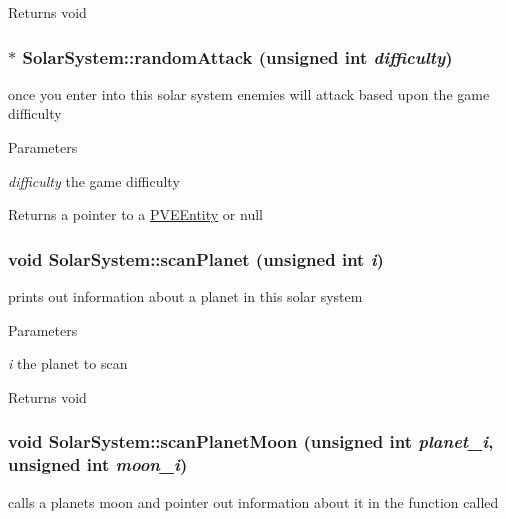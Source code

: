 \begin{DoxyReturn}{Returns}
void 
\end{DoxyReturn}
\hypertarget{classSolarSystem_a6f30ebe96f6ef56d967f3e6c368057d2}{
\subsubsection[{randomAttack}]{ $\ast$ SolarSystem::randomAttack (unsigned int {\em difficulty})}}
\label{df/d5e/classSolarSystem_a6f30ebe96f6ef56d967f3e6c368057d2}
once you enter into this solar system enemies will attack based upon the game difficulty


\begin{DoxyParams}{Parameters}
\item[{\em difficulty}]the game difficulty\end{DoxyParams}
\begin{DoxyReturn}{Returns}
a pointer to a \hyperlink{classPVEEntity}{PVEEntity} or null 
\end{DoxyReturn}
\hypertarget{classSolarSystem_a7be656472d3867ed7eb416da51982463}{
\subsubsection[{scanPlanet}]{\setlength{\rightskip}{0pt plus 5cm}void SolarSystem::scanPlanet (unsigned int {\em i})}}
\label{df/d5e/classSolarSystem_a7be656472d3867ed7eb416da51982463}
prints out information about a planet in this solar system


\begin{DoxyParams}{Parameters}
\item[{\em i}]the planet to scan\end{DoxyParams}
\begin{DoxyReturn}{Returns}
void 
\end{DoxyReturn}
\hypertarget{classSolarSystem_a7d9d47e7b7a987f4d2bad4ebe40ac911}{
\subsubsection[{scanPlanetMoon}]{\setlength{\rightskip}{0pt plus 5cm}void SolarSystem::scanPlanetMoon (unsigned int {\em planet\_\-i}, \/  unsigned int {\em moon\_\-i})}}
\label{df/d5e/classSolarSystem_a7d9d47e7b7a987f4d2bad4ebe40ac911}
calls a planets moon and pointer out information about it in the function called


